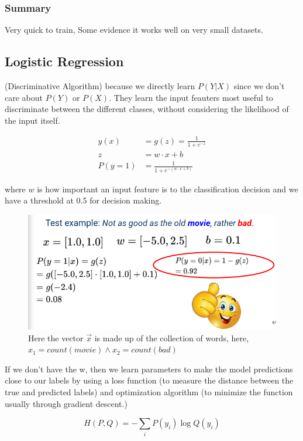 \documentclass[11pt]{article}
\begin{document}
\subsubsection{Summary}

Very quick to train, Some evidence it works well on very small datasets.

\subsection{Logistic Regression}

(Discriminative Algorithm) because we directly learn $P(Y|X)$ since we don't care about $P(Y)$ or $P(X)$. They learn the input feauters most useful to discriminate between the different classes, without considering the likelihood of the input itself.

\begin{align*}
    y(x) & = g(z) = \frac 1 {1 + e^{-z}} \\
    z & = w \cdot x + b \\
    P(y=1) & = \frac{1 } {1 + e^{- (w \cdot x + b)}}
\end{align*}

where $w$ is how important an input feature is to the classification decision and we have a threshold at 0.5 for decision making.

\begin{figure}[H]
    \centering
    \includegraphics[trim={0.7cm 0 0 0}, clip, width=.6\linewidth]{figures/example2.png}
    \caption{Here the vector $\vec{x}$ is made up of the collection of words, here, $x_1=count(movie) \wedge x_2=count(bad)$}
\end{figure}

If we don't have the w, then we learn parameters to make the model predictions close to our labels by using a loss function (to measure the distance between the true and predicted labels) and optimization algorithm (to minimize the function usually through gradient descent.)

\begin{definition}
    \begin{equation*}
        H(P,Q) = -\sum_i P(y_i)\log Q(y_i)
    \end{equation*}
\end{definition}
\end{document}
